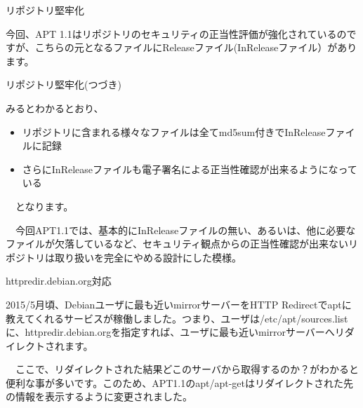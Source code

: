 \begin{frame}[containsverbatim]{リポジトリ堅牢化}

  今回、APT 1.1はリポジトリのセキュリティの正当性評価が強化されているのですが、こちらの元となるファイルにReleaseファイル(InReleaseファイル）があります。

  
\end{frame}

\begin{frame}{リポジトリ堅牢化(つづき)}

  みるとわかるとおり、

\begin{itemize}
\item リポジトリに含まれる様々なファイルは全てmd5sum付きでInReleaseファイルに記録
\item さらにInReleaseファイルも電子署名による正当性確認が出来るようになっている
\end{itemize}

　となります。

　今回APT1.1では、基本的にInReleaseファイルの無い、あるいは、他に必要なファイルが欠落しているなど、セキュリティ観点からの正当性確認が出来ないリポジトリは取り扱いを完全にやめる設計にした模様。
  
\end{frame}
  
\begin{frame}{httpredir.debian.org対応}

  2015/5月頃、Debianユーザに最も近いmirrorサーバーをHTTP Redirectでaptに教えてくれるサービスが稼働しました。つまり、ユーザは/etc/apt/sources.listに、httpredir.debian.orgを指定すれば、ユーザに最も近いmirrorサーバーへリダイレクトされます。

 　ここで、リダイレクトされた結果どこのサーバから取得するのか？がわかると便利な事が多いです。このため、APT1.1のapt/apt-getはリダイレクトされた先の情報を表示するように変更されました。
  
\end{frame}

